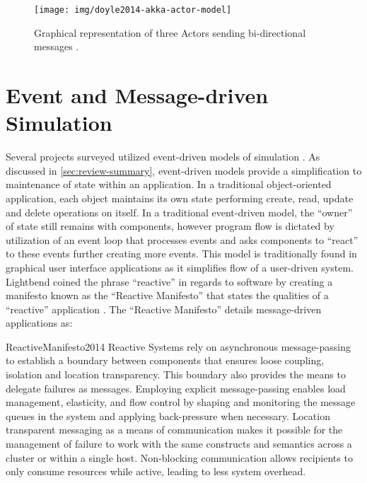 \begin{figure}[bh!]
    \centering
    \texttt{[image: img/doyle2014-akka-actor-model]}
    \caption{Graphical representation of three Actors sending bi-directional messages \cite{DoyleAkka2014}.}
    \label{fig:doyle2014-akka-actor-model}
\end{figure} 

\section{Event and Message-driven Simulation}

Several projects surveyed utilized event-driven models of simulation \cite{Nakamura2013, McLoughlin2010, Garcia2009}. As discussed in \cref{sec:review-summary}, event-driven models provide a simplification to maintenance of state within an application. In a traditional object-oriented application, each object maintains its own state performing create, read, update and delete operations on itself. In a traditional event-driven model, the ``owner'' of state still remains with components, however program flow is dictated by utilization of an event loop that processes events and asks components to ``react'' to these events further creating more events. This model is traditionally found in graphical user interface applications as it simplifies flow of a user-driven system. Lightbend coined the phrase ``reactive'' in regards to software by creating a manifesto known as the ``Reactive Manifesto'' that states the qualities of a ``reactive'' application \cite{ReactiveManifesto2014}. The ``Reactive Manifesto'' details message-driven applications as: 
\begin{displaycquote}{ReactiveManifesto2014}
    Reactive Systems rely on asynchronous message-passing to establish a boundary between components that ensures loose coupling, isolation and location transparency. This boundary also provides the means to delegate failures as messages. Employing explicit message-passing enables load management, elasticity, and flow control by shaping and monitoring the message queues in the system and applying back-pressure when necessary. Location transparent messaging as a means of communication makes it possible for the management of failure to work with the same constructs and semantics across a cluster or within a single host. Non-blocking communication allows recipients to only consume resources while active, leading to less system overhead.
\end{displaycquote}
